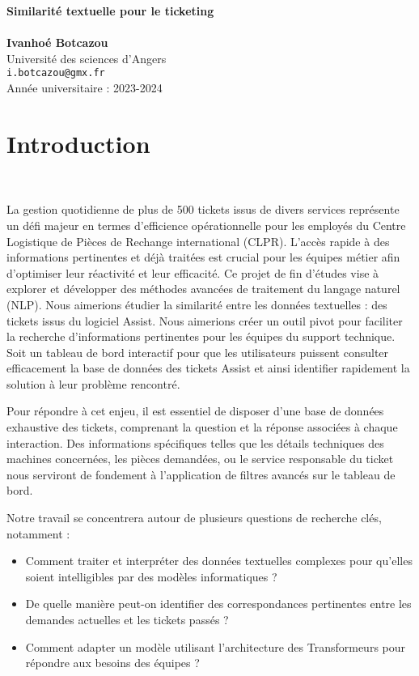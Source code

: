 \documentclass[12pt]{article}
\makeatletter
\newcommand{\titlePage}{
		\begin{center}
			\noindent\makebox[\linewidth]{\rule{\textwidth}{4pt}} 
			\Huge\textbf{\sc Similarité textuelle pour le ticketing}\\[-0.25cm]
			\noindent\makebox[\linewidth]{\rule{\textwidth}{2pt}} 
			\hfill\\[1cm]
			\vspace*{4pt}
			\large \textbf{Ivanhoé Botcazou}\\
			\large Université des sciences d'Angers \\
			\texttt{i.botcazou@gmx.fr}\\[2cm]
			Année universitaire : 2023-2024
		\end{center}
}
\theoremstyle{definition}
\makeatother
\begin{document}
	
	\titlePage %
	\tableofcontents
	\section{Introduction}\quad\\[-0.5cm]
	
	 \par La gestion quotidienne de plus de 500 tickets issus de divers services représente un défi majeur en termes d'efficience opérationnelle pour les employés du Centre Logistique de Pièces de Rechange international (CLPR). L'accès rapide à des informations pertinentes et déjà traitées est crucial pour les équipes métier afin d'optimiser leur réactivité et leur efficacité. Ce projet de fin d'études vise à explorer et développer des méthodes avancées de traitement du langage naturel (NLP). Nous aimerions étudier la similarité entre les données textuelles : des tickets issus du logiciel Assist. Nous aimerions créer un outil pivot pour faciliter la recherche d'informations pertinentes pour les équipes du support technique. Soit un tableau de bord interactif pour que les utilisateurs puissent consulter efficacement la base de données des tickets Assist et ainsi identifier rapidement la solution à leur problème rencontré.
	
	Pour répondre à cet enjeu, il est essentiel de disposer d'une base de données exhaustive des tickets, comprenant la question et la réponse associées à chaque interaction. Des informations spécifiques telles que les détails techniques des machines concernées, les pièces demandées, ou le service responsable du ticket nous serviront de fondement à l'application de filtres avancés sur le tableau de bord.
	
	Notre travail se concentrera autour de plusieurs questions de recherche clés, notamment : 
		\begin{itemize}[-]
		\item Comment traiter et interpréter des données textuelles complexes pour qu'elles soient intelligibles par des modèles informatiques ? 
		\item De quelle manière peut-on identifier des correspondances pertinentes entre les demandes actuelles et les tickets passés ? 
		\item Comment adapter un modèle utilisant l'architecture des Transformeurs pour répondre aux besoins des équipes ? 
	\end{itemize}
	
\end{document}
